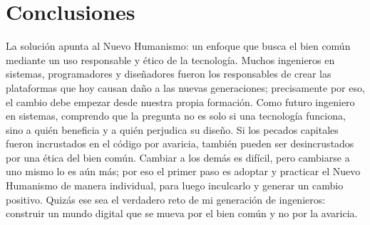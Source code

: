 \section{Conclusiones}

La solución apunta al Nuevo Humanismo: un enfoque que busca el bien común mediante un uso responsable y ético de la tecnología. Muchos ingenieros en sistemas, programadores y diseñadores fueron los responsables de crear las plataformas que hoy causan daño a las nuevas generaciones; precisamente por eso, el cambio debe empezar desde nuestra propia formación. Como futuro ingeniero en sistemas, comprendo que la pregunta no es solo si una tecnología funciona, sino a quién beneficia y a quién perjudica su diseño. Si los pecados capitales fueron incrustados en el código por avaricia, también pueden ser desincrustados por una ética del bien común. Cambiar a los demás es difícil, pero cambiarse a uno mismo lo es aún más; por eso el primer paso es adoptar y practicar el Nuevo Humanismo de manera individual, para luego inculcarlo y generar un cambio positivo. Quizás ese sea el verdadero reto de mi generación de ingenieros: construir un mundo digital que se mueva por el bien común y no por la avaricia.

